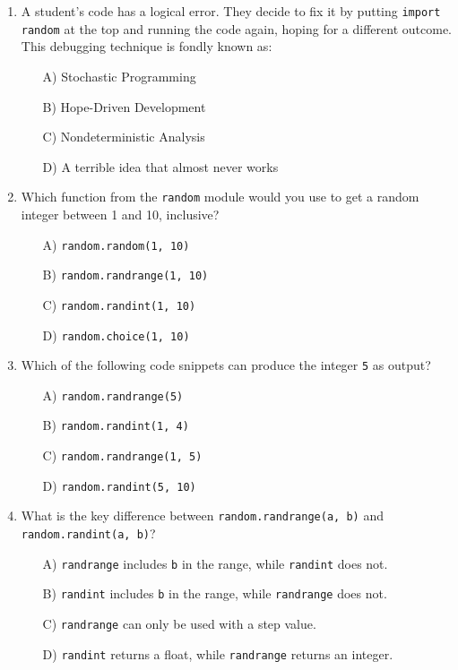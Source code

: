 \documentclass[9pt]{article}
\begin{document}
\begin{multicols}{2}
\begin{enumerate}
\item A student's code has a logical error. They decide to fix it by putting \texttt{import random} at the top and running the code again, hoping for a different outcome. This debugging technique is fondly known as:
\begin{enumerate}
    \item[A)] Stochastic Programming
    \item[B)] Hope-Driven Development
    \item[C)] Nondeterministic Analysis
    \item[D)] A terrible idea that almost never works
\end{enumerate}

\item Which function from the \texttt{random} module would you use to get a random integer between 1 and 10, inclusive?
\begin{enumerate}
    \item[A)] \texttt{random.random(1, 10)}
    \item[B)] \texttt{random.randrange(1, 10)}
    \item[C)] \texttt{random.randint(1, 10)}
    \item[D)] \texttt{random.choice(1, 10)}
\end{enumerate}

\item Which of the following code snippets can produce the integer \texttt{5} as output?
\begin{enumerate}
    \item[A)] \texttt{random.randrange(5)}
    \item[B)] \texttt{random.randint(1, 4)}
    \item[C)] \texttt{random.randrange(1, 5)}
    \item[D)] \texttt{random.randint(5, 10)}
\end{enumerate}

\item What is the key difference between \texttt{random.randrange(a, b)} and \texttt{random.randint(a, b)}?
\begin{enumerate}
    \item[A)] \texttt{randrange} includes \texttt{b} in the range, while \texttt{randint} does not.
    \item[B)] \texttt{randint} includes \texttt{b} in the range, while \texttt{randrange} does not.
    \item[C)] \texttt{randrange} can only be used with a step value.
    \item[D)] \texttt{randint} returns a float, while \texttt{randrange} returns an integer.
\end{enumerate}


\end{enumerate}
\end{multicols}
\end{document}
